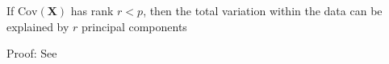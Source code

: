 \begin{theorem}
\label{def:lowrank}
If $\mbox{Cov}(\boldsymbol{X})$ has rank $r < p$, then the total variation within the data can be explained by $r$ principal components
\end{theorem}
Proof: See \cite[page 220]{Mardia+etal:1979}